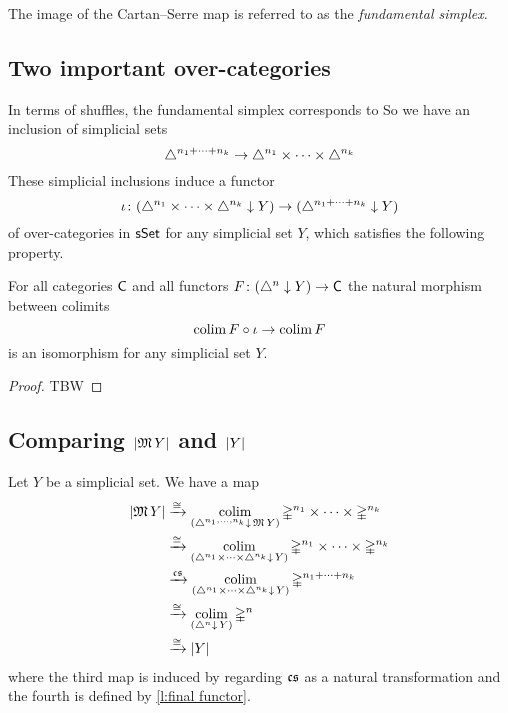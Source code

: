 
The image of the Cartan--Serre map is referred to as the \textit{fundamental simplex}. 

\subsection{Two important over-categories}

In terms of shuffles, the fundamental simplex corresponds to 
So we have an inclusion of simplicial sets
\[
\triangle^{n_1+\dots+n_k} \to \triangle^{n_1} \times \dots \times \triangle^{n_k}
\]
These simplicial inclusions induce a functor
\[
\operatorname{\iota} \colon (\triangle^{n_1} \times \dots \times \triangle^{n_k} \downarrow Y) \to (\triangle^{n_1+\dots+n_k} \downarrow Y)
\]
of over-categories in $\mathsf{sSet}$ for any simplicial set $Y$, which satisfies the following property.

\begin{lemma} \label{l:final functor}
	For all categories $\mathsf{C}$ and all functors $F \colon (\triangle^n \downarrow Y) \to \mathsf{C}$ the natural morphism between colimits
	\[
	\operatorname*{colim} F \circ \operatorname{\iota} \to \operatorname*{colim} F
	\]
	is an isomorphism for any simplicial set $Y$.
\end{lemma}

\begin{proof}
	TBW
\end{proof}

\subsection{Comparing $\lvert\operatorname{\mathfrak{M}} Y\rvert$ and $\lvert Y\rvert$}

Let $Y$ be a simplicial set.
We have a map
\[
\begin{split}
\lvert\operatorname{\mathfrak{M}} Y\rvert & \xrightarrow{\cong}
\operatorname*{colim}_{(\triangle^{n_1, \dots, n_k} \downarrow \, \operatorname{\mathfrak{M}} Y)} \mathbb{\Delta}^{n_1} \times \cdots \times \mathbb{\Delta}^{n_k} \\ & \xrightarrow{\cong}
\operatorname*{colim}_{(\triangle^{n_1} \times \dots \times \triangle^{n_k} \downarrow \, Y)} \mathbb{\Delta}^{n_1} \times \cdots \times \mathbb{\Delta}^{n_k} \\ & \xrightarrow{\operatorname{\mathfrak{cs}}}
\operatorname*{colim}_{(\triangle^{n_1} \times \dots \times \triangle^{n_k} \downarrow \, Y)} \mathbb{\Delta}^{n_1 + \dots + n_k} \\ & \xrightarrow{\cong}
\operatorname*{colim}_{(\triangle^{n} \downarrow \, Y)} \mathbb{\Delta}^{n} \\ & \xrightarrow{\cong}
\lvert Y\rvert
\end{split}
\]
where the third map is induced by regarding $\operatorname{\mathfrak{cs}}$ as a natural transformation and the fourth is defined by \cref{l:final functor}.

